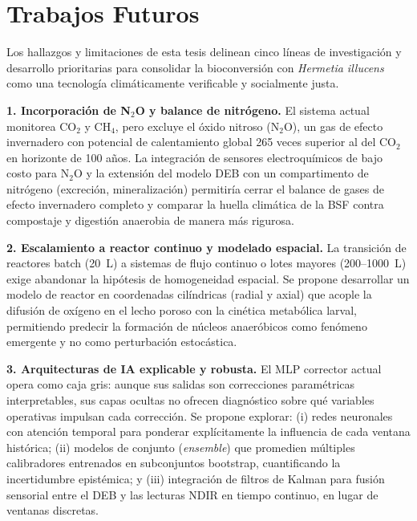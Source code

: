 \section{Trabajos Futuros}
\label{sec:cap6_futuro}

Los hallazgos y limitaciones de esta tesis delinean cinco líneas de investigación y desarrollo prioritarias para consolidar la bioconversión con \emph{Hermetia illucens} como una tecnología climáticamente verificable y socialmente justa.

\textbf{1. Incorporación de N$_2$O y balance de nitrógeno.} El sistema actual monitorea CO$_2$ y CH$_4$, pero excluye el óxido nitroso (N$_2$O), un gas de efecto invernadero con potencial de calentamiento global 265 veces superior al del CO$_2$ en horizonte de 100 años. La integración de sensores electroquímicos de bajo costo para N$_2$O y la extensión del modelo DEB con un compartimento de nitrógeno (excreción, mineralización) permitiría cerrar el balance de gases de efecto invernadero completo y comparar la huella climática de la BSF contra compostaje y digestión anaerobia de manera más rigurosa.

\textbf{2. Escalamiento a reactor continuo y modelado espacial.} La transición de reactores batch (20~L) a sistemas de flujo continuo o lotes mayores (200--1000~L) exige abandonar la hipótesis de homogeneidad espacial. Se propone desarrollar un modelo de reactor en coordenadas cilíndricas (radial y axial) que acople la difusión de oxígeno en el lecho poroso con la cinética metabólica larval, permitiendo predecir la formación de núcleos anaeróbicos como fenómeno emergente y no como perturbación estocástica.

\textbf{3. Arquitecturas de IA explicable y robusta.} El MLP corrector actual opera como caja gris: aunque sus salidas son correcciones paramétricas interpretables, sus capas ocultas no ofrecen diagnóstico sobre qué variables operativas impulsan cada corrección. Se propone explorar: (i) redes neuronales con atención temporal para ponderar explícitamente la influencia de cada ventana histórica; (ii) modelos de conjunto (\emph{ensemble}) que promedien múltiples calibradores entrenados en subconjuntos bootstrap, cuantificando la incertidumbre epistémica; y (iii) integración de filtros de Kalman para fusión sensorial entre el DEB y las lecturas NDIR en tiempo continuo, en lugar de ventanas discretas.

